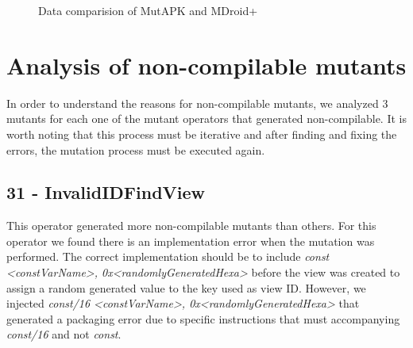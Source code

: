 \begin{landscape}
\begin{figure}[t]
	\caption{Data comparision of MutAPK and MDroid+}
\end{figure}
\end{landscape}

\section{Analysis of non-compilable mutants}

In order to understand the reasons for non-compilable mutants, we analyzed 3 mutants for each one of the mutant operators that generated non-compilable. It is worth noting that this process must be iterative and after finding and fixing the errors, the mutation process must be executed again.

\subsection{31 - InvalidIDFindView}

This operator generated more non-compilable mutants than others. For this operator we found there is an implementation error when the mutation was performed. The correct implementation should be to include \textit{const <constVarName>, 0x<randomlyGeneratedHexa>} before the view was created to assign a random generated value to the key used as view ID. However, we injected \textit{const/16 <constVarName>, 0x<randomlyGeneratedHexa>} that generated a packaging error due to specific instructions that must accompanying \textit{const/16} and not \textit{const}.

